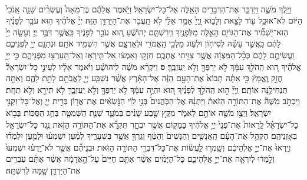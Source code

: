 \documentclass[twoside, openany, parskip=half, 11pt]{book}
\begin{document}
\begin{footnotesize}
\begin{multicols}{2}
\\
 וַיֵּ֖לֶךְ מֹשֶׁ֑ה וַיְדַבֵּ֛ר אֶת־הַדְּבָרִ֥ים הָאֵ֖לֶּה אֶל־כָּל־יִשְׂרָאֵֽל׃ וַיֹּ֣אמֶר אֲלֵהֶ֗ם בֶּן־מֵאָה֩ וְעֶשְׂרִ֨ים שָׁנָ֤ה אָֽנֹכִי֙ הַיּ֔וֹם לֹֽא־אוּכַ֥ל ע֖וֹד לָצֵ֣את וְלָב֑וֹא וַֽיְיָ֙ אָמַ֣ר אֵלַ֔י לֹ֥א תַֽעֲבֹ֖ר אֶת־הַיַּרְדֵּ֥ן הַזֶּֽה׃ יְיָ֨ אֱלֹהֶ֜יךָ ה֣וּא עֹבֵ֣ר לְפָנֶ֗יךָ הֽוּא־יַשְׁמִ֞יד אֶת־הַגּוֹיִ֥ם הָאֵ֛לֶּה מִלְּפָנֶ֖יךָ וִֽירִשְׁתָּ֑ם יְהוֹשֻׁ֗עַ ה֚וּא עֹבֵ֣ר לְפָנֶ֔יךָ כַּֽאֲשֶׁ֖ר דִּבֶּ֥ר יְיָ׃ 
 וְעָשָׂ֤ה יְיָ֙ לָהֶ֔ם כַּֽאֲשֶׁ֣ר עָשָׂ֗ה לְסִיח֥וֹן וּלְע֛וֹג מַלְכֵ֥י הָֽאֱמֹרִ֖י וּלְאַרְצָ֑ם אֲשֶׁ֥ר הִשְׁמִ֖יד אֹתָֽם׃ וּנְתָנָ֥ם יְיָ֖ לִפְנֵיכֶ֑ם וַֽעֲשִׂיתֶ֣ם לָהֶ֔ם כְּכָ֨ל־הַמִּצְוָ֔ה אֲשֶׁ֥ר צִוִּ֖יתִי אֶתְכֶֽם׃ חִזְק֣וּ וְאִמְצ֔וּ אַל־תִּֽירְא֥וּ וְאַל־תַּֽעַרְצ֖וּ מִפְּנֵיהֶ֑ם כִּ֣י יְיָ֣ אֱלֹהֶ֗יךָ ה֚וּא הַֽהֹלֵ֣ךְ עִמָּ֔ךְ לֹ֥א יַרְפְּךָ֖ וְלֹ֥א יַֽעַזְבֶֽךָּ׃ \textbf{ס} 
 וַיִּקְרָ֨א מֹשֶׁ֜ה לִֽיהוֹשֻׁ֗עַ וַיֹּ֨אמֶר אֵלָ֜יו לְעֵינֵ֣י כָל־יִשְׂרָאֵל֘ חֲזַ֣ק וֶֽאֱמָץ֒ כִּ֣י אַתָּ֗ה תָּבוֹא֙ אֶת־הָעָ֣ם הַזֶּ֔ה אֶל־הָאָ֕רֶץ אֲשֶׁ֨ר נִשְׁבַּ֧ע יְיָ֛ לַֽאֲבֹתָ֖ם לָתֵ֣ת לָהֶ֑ם וְאַתָּ֖ה תַּנְחִילֶ֥נָּה אוֹתָֽם׃ וַֽיְיָ֞ ה֣וּא הַֽהֹלֵ֣ךְ לְפָנֶ֗יךָ ה֚וּא יִהְיֶ֣ה עִמָּ֔ךְ לֹ֥א יַרְפְּךָ֖ וְלֹ֣א יַֽעַזְבֶ֑ךָּ לֹ֥א תִירָ֖א וְלֹ֥א תֵחָֽת׃ וַיִּכְתֹּ֣ב מֹשֶׁה֘ אֶת־הַתּוֹרָ֣ה הַזֹּאת֒ וַֽיִּתְּנָ֗הּ אֶל־הַכֹּֽהֲנִים֙ בְּנֵ֣י לֵוִ֔י הַנֹּ֣שְׂאִ֔ים אֶת־אֲר֖וֹן בְּרִ֣ית יְיָ֑ וְאֶל־כָּל־זִקְנֵ֖י יִשְׂרָאֵֽל׃ וַיְצַ֥ו מֹשֶׁ֖ה אוֹתָ֣ם לֵאמֹ֑ר מִקֵּ֣ץ שֶׁ֣בַע שָׁנִ֗ים בְּמֹעֵ֛ד שְׁנַ֥ת הַשְּׁמִטָּ֖ה בְּחַ֥ג הַסֻּכּֽוֹת׃ בְּב֣וֹא כָל־יִשְׂרָאֵ֗ל לֵֽרָאוֹת֙ אֶת־פְּנֵי֙ יְיָ֣ אֱלֹהֶ֔יךָ בַּמָּק֖וֹם אֲשֶׁ֣ר יִבְחָ֑ר תִּקְרָ֞א אֶת־הַתּוֹרָ֥ה הַזֹּ֛את נֶ֥גֶד כָּל־יִשְׂרָאֵ֖ל בְּאָזְנֵיהֶֽם׃ הַקְהֵ֣ל אֶת־הָעָ֗ם הָֽאֲנָשִׁ֤ים וְהַנָּשִׁים֙ וְהַטַּ֔ף וְגֵֽרְךָ֖ אֲשֶׁ֣ר בִּשְׁעָרֶ֑יךָ לְמַ֨עַן יִשְׁמְע֜וּ וּלְמַ֣עַן יִלְמְד֗וּ וְיָֽרְאוּ֙ אֶת־יְיָ֣ אֱלֹֽהֵיכֶ֔ם וְשָֽׁמְר֣וּ לַֽעֲשׂ֔וֹת אֶת־כָּל־דִּבְרֵ֖י הַתּוֹרָ֥ה הַזֹּֽאת׃ וּבְנֵיהֶ֞ם אֲשֶׁ֣ר לֹא־יָֽדְע֗וּ יִשְׁמְעוּ֙ וְלָ֣מְד֔וּ לְיִרְאָ֖ה אֶת־יְיָ֣ אֱלֹֽהֵיכֶ֑ם כָּל־הַיָּמִ֗ים אֲשֶׁ֨ר אַתֶּ֤ם חַיִּים֙ עַל־הָ֣אֲדָמָ֔ה אֲשֶׁ֨ר אַתֶּ֜ם עֹֽבְרִ֧ים אֶת־הַיַּרְדֵּ֛ן שָׁ֖מָּה לְרִשְׁתָּֽהּ׃


\end{multicols}
\end{footnotesize}
\end{document}
